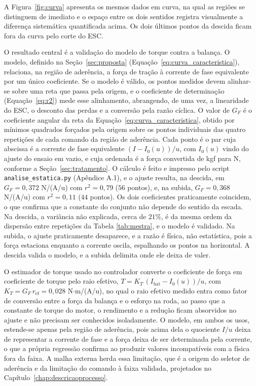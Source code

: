 A Figura~\ref{fig:curva} apresenta os mesmos dados em curva, na qual as regiões se
distinguem de imediato e o espaço entre os dois sentidos registra visualmente a diferença
sistemática quantificada acima. Os dois últimos pontos da descida ficam fora da curva pelo corte do ESC.

O resultado central é a validação do modelo de torque contra a balança. O modelo, definido
na Seção~\ref{sec:proposta} (Equação~\eqref{eq:curva_caracteristica}), relaciona, na
região de aderência, a força de tração à corrente de fase equivalente por um único
coeficiente. Se o modelo é válido, os pontos medidos devem alinhar-se sobre uma reta que
passa pela origem, e o coeficiente de determinação (Equação~\eqref{eq:r2}) mede esse
alinhamento, abrangendo, de uma vez, a linearidade do ESC, o desconto das perdas e a
conversão pela razão cíclica. O valor de $G_F$ é o coeficiente angular da reta da
Equação~\eqref{eq:curva_caracteristica}, obtido por mínimos quadrados forçados pela
origem sobre os pontos individuais das quatro repetições de cada comando da região de
aderência. Cada ponto é o par cuja abscissa é a corrente de fase equivalente
$(I - I_0(u))/u$, com $I_0(u)$ vindo do ajuste do ensaio em vazio, e cuja ordenada é a
força convertida de kgf para N, conforme a Seção~\ref{sec:tratamento}. O cálculo é feito
e impresso pelo script \texttt{analise\_estatica.py} (Apêndice A.1), e o ajuste resulta,
na descida, em $G_F = 0{,}372$ N/(A/u) com $r^2 = 0{,}79$ ($56$ pontos), e, na subida,
$G_F = 0{,}368$ N/(A/u) com $r^2 = 0{,}11$ ($44$ pontos). Os dois coeficientes praticamente coincidem, o que
confirma que a constante do conjunto não depende do sentido da escada. Na descida, a
variância não explicada, cerca de $21\%$, é da mesma ordem da dispersão entre repetições
da Tabela \ref{tab:mestra}, e o modelo é validado. Na subida, o ajuste praticamente
desaparece, e a razão é física, não estatística, pois a força estaciona enquanto a corrente
oscila, espalhando os pontos na horizontal. A descida valida o modelo, e a subida delimita
onde ele deixa de valer.


O estimador de torque usado no controlador converte o coeficiente de força em coeficiente
de torque pelo raio efetivo, $\hat{T} = K_T\,(I_\mathrm{bat} - I_0(u))/u$, com $K_T = G_F\,
r_\mathrm{ef} = 0{,}028$ N$\cdot$m/(A/u), no qual o raio efetivo medido entra como fator
de conversão entre a força da balança e o esforço na roda, ao passo que a constante de
torque do motor, o rendimento e a redução ficam absorvidos no ajuste e não precisam ser
conhecidos isoladamente. O
modelo, em ambos os usos, estende-se apenas pela região de aderência, pois acima dela o
quociente $I/u$ deixa de representar a corrente de fase e a força deixa de ser determinada
pela corrente, o que a própria regressão confirma ao produzir valores incompatíveis com a
física fora da faixa. A malha externa herda essa limitação, que é a origem do seletor de
aderência e da limitação do comando à faixa validada, projetados no
Capítulo~\ref{chap:descricaoprocesso}.

